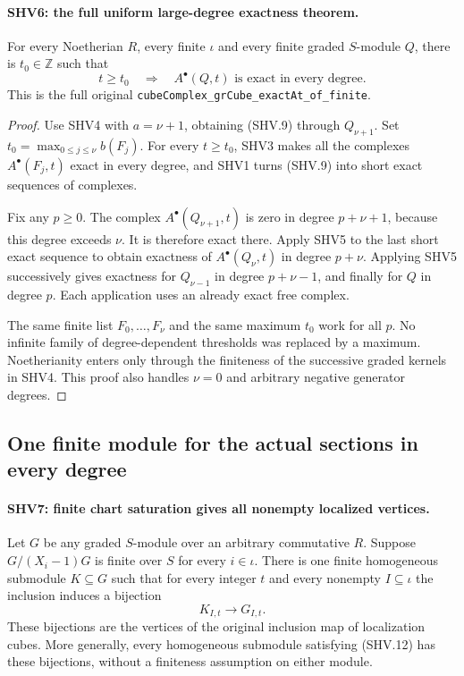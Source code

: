 \paragraph{SHV6: the full uniform large-degree exactness theorem.}
\label{claim:SHV6}
For every Noetherian $R$, every finite $\iota$ and every finite
graded $S$-module $Q$, there is $t_0\in\mathbb Z$ such that
\[
 t\ge t_0\quad\Longrightarrow\quad
          A^\bullet(Q,t)\text{ is exact in every degree}.
                                                        \tag{SHV.10}
\]
This is the full original
\texttt{cubeComplex\_\allowbreak grCube\_\allowbreak exactAt\_\allowbreak of\_\allowbreak finite}.

\begin{proof}
Use SHV4 with $a=\nu+1$, obtaining (SHV.9) through $Q_{\nu+1}$.
Set
$t_0=\max_{0\le j\le\nu} b(F_j)$.
For every $t\ge t_0$, SHV3 makes all the complexes
$A^\bullet(F_j,t)$ exact in every degree, and SHV1 turns
(SHV.9) into short exact sequences of complexes.

Fix any $p\ge0$.  The complex $A^\bullet(Q_{\nu+1},t)$ is
zero in degree $p+\nu+1$, because this degree exceeds $\nu$.
It is therefore exact there.  Apply SHV5 to the last short exact
sequence to obtain exactness of $A^\bullet(Q_\nu,t)$ in
degree $p+\nu$.  Applying SHV5 successively gives exactness for
$Q_{\nu-1}$ in degree $p+\nu-1$, and finally for $Q$ in degree
$p$.  Each application uses an already exact free complex.

The same finite list $F_0,\ldots,F_\nu$ and the same maximum
$t_0$ work for all $p$.  No infinite family of degree-dependent
thresholds was replaced by a maximum.  Noetherianity enters only
through the finiteness of the successive graded kernels in SHV4.
This proof also handles $\nu=0$ and arbitrary negative generator
degrees.
\end{proof}

\subsection{One finite module for the actual sections in every degree}

\paragraph{SHV7: finite chart saturation gives all nonempty localized vertices.}
\label{claim:SHV7}
Let $G$ be any graded $S$-module over an arbitrary commutative $R$.
Suppose $G/(X_i-1)G$ is finite over $S$ for every $i\in\iota$.
There is one finite homogeneous submodule $K\subseteq G$ such that
for every integer $t$ and every nonempty $I\subseteq\iota$ the
inclusion induces a bijection
\[
                    K_{I,t}\longrightarrow G_{I,t}.
                                                        \tag{SHV.11}
\]
These bijections are the vertices of the original inclusion map
of localization cubes.  More generally, every homogeneous submodule
satisfying (SHV.12) has these bijections, without a finiteness
assumption on either module.

